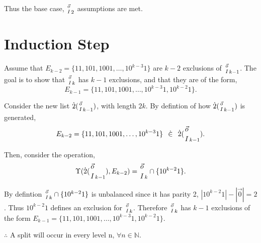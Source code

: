 \documentclass[11pt,leqno]{article}
\newcommand{\sss}{\hspace{0.1in}}
\theoremstyle{definition}
\theoremstyle{remark}
\begin{document}
Thus the base case, $ {\vec{o} \atop I}_{2} $ assumptions are met.

\section {Induction Step}
Assume that $ E_{k-2} = \{11, 101, 1001, \dots, 10^{k-3}1\} $ are $ k-2 $ exclusions of $ {\vec{o} \atop I}_{k-1} $.
The goal is to show that ${\vec{o} \atop I}_{k}$ has $k-1$ exclusions, and that they are of the form, 
$$ E_{k-1} = \{11, 101, 1001, \dots, 10^{k-3}1, 10^{k-2}1\}. $$

Consider the new list $\dot{2} ({\vec{o} \atop I}_{k-1})$, with length $2k$.
By defintion of how $\dot{2} ({\vec{o} \atop I}_{k-1})$ is generated, 
	$$ E_{k-2} = \{11, 101, 1001, \dots, 10^{k-3}1 \} \sss \dot{\in} \sss \dot{2}( {\vec{o} \atop I}_{k-1}).$$

Then, consider the operation,	
	$$ \Upsilon( \dot{2} ({\vec{o} \atop I}_{k-1}), E_{k-2}) = {\vec{o} \atop I}_{k} \cap \{10^{k-2}1\}. $$

By defintion ${\vec{o} \atop I}_{k} \cap \{10^{k-2}1\}$ is unbalanced since it has parity 2, $|10^{k-2}1| - |\vec{0}| = 2$. Thus $10^{k-2}1$ defines an exclusion for ${\vec{o} \atop I}_{k}$.
Therefore ${\vec{o} \atop I}_{k}$ has $k-1$ exclusions of the form $E_{k-1} = \{11, 101, 1001, \dots, 10^{k-3}1, 10^{k-2}1\}$. 

$\therefore$	A split will occur in every level n, $\forall n \in \mathbb{N}.$
\end{document}
